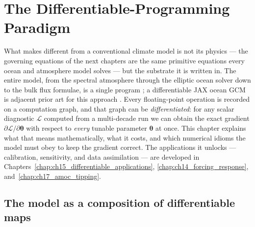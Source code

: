 \chapter{The Differentiable-Programming Paradigm}
\label{chap:ch03_differentiable}

\providecommand{\Mop}{\mathcal{M}}          %
\providecommand{\jac}{\mathbf{J}}           %
\providecommand{\state}{\mathbf{s}}         %
\providecommand{\param}{\boldsymbol{\theta}}%
\providecommand{\loss}{\mathcal{L}}         %
\providecommand{\drho}{\Delta\dens}         %

What makes \model{} different from a conventional climate model is not its physics --- the
governing equations of the next chapters are the same primitive equations every ocean and
atmosphere model solves --- but the substrate it is written in. The entire model, from the
spectral atmosphere through the elliptic ocean solver down to the bulk flux formulae, is a
single \jax{} program \citep{jax2018}; a differentiable JAX ocean GCM is adjacent prior art
for this approach \citep{hafner2018veros}. Every floating-point operation is recorded on a
computation graph, and that graph can be \emph{differentiated}: for any scalar diagnostic
$\loss$ computed from a multi-decade run we can obtain the exact gradient $\partial\loss/\partial\param$
with respect to \emph{every} tunable parameter $\param$ at once. This chapter explains what that
means mathematically, what it costs, and which numerical idioms the model must obey to keep the
gradient correct. The applications it unlocks --- calibration, sensitivity, and data assimilation
--- are developed in Chapters~\ref{chap:ch15_differentiable_applications},
\ref{chap:ch14_forcing_response}, and~\ref{chap:ch17_amoc_tipping}.

\section{The model as a composition of differentiable maps}

